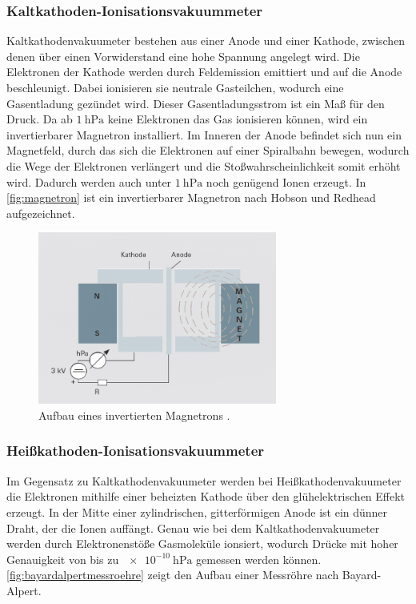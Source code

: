 \subsubsection{Kaltkathoden-Ionisationsvakuummeter}
\label{subsubsec:kaltkathode}

Kaltkathodenvakuumeter bestehen aus einer Anode und einer Kathode, zwischen denen über einen Vorwiderstand eine hohe Spannung angelegt wird. Die Elektronen der Kathode werden durch Feldemission emittiert und auf die Anode beschleunigt.
Dabei ionisieren sie neutrale Gasteilchen, wodurch eine Gasentladung gezündet wird. Dieser Gasentladungsstrom ist ein Maß für den Druck. Da ab $\SI{1}{\hecto\pascal}$ keine Elektronen das Gas ionisieren können,
wird ein invertierbarer Magnetron installiert. Im Inneren der Anode befindet sich nun ein Magnetfeld, durch das sich die Elektronen auf einer Spiralbahn bewegen, wodurch die Wege der Elektronen verlängert und die Stoßwahrscheinlichkeit somit 
erhöht wird. Dadurch werden auch unter $\SI{1}{\hecto\pascal}$ noch genügend Ionen erzeugt. In \autoref{fig:magnetron} ist ein invertierbarer Magnetron nach Hobson und Redhead aufgezeichnet.

\begin{figure}[H]
    \centering
    \includegraphics[width=0.7\textwidth]{data/kaltkathode-aufbau.jpg}
    \caption{Aufbau eines invertierten Magnetrons \cite{Totaldruckmessung}.}
    \label{fig:magnetron}
\end{figure}

\subsubsection{Heißkathoden-Ionisationsvakuummeter}
\label{subsubsec:heißkathode}

Im Gegensatz zu Kaltkathodenvakuumeter werden bei Heißkathodenvakuumeter die Elektronen mithilfe einer beheizten Kathode über den glühelektrischen Effekt erzeugt.
In der Mitte einer zylindrischen, gitterförmigen Anode ist ein dünner Draht, der die Ionen auffängt. Genau wie bei dem Kaltkathodenvakuumeter werden durch Elektronenstöße Gasmoleküle ionsiert, wodurch 
Drücke mit hoher Genauigkeit von bis zu $\SI{e-10}{\hecto\pascal}$ gemessen werden können. \autoref{fig:bayardalpertmessroehre} zeigt den Aufbau einer Messröhre nach Bayard-Alpert.

